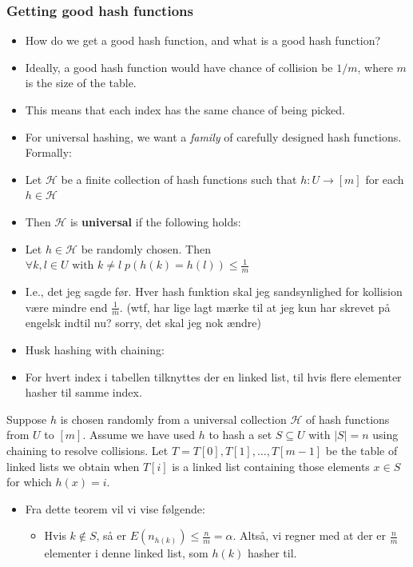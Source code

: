 \documentclass{beamer}
\begin{document}
\begin{frame}[allowframebreaks]
  \frametitle{Getting good hash functions}
  \begin{itemize}
  \item How do we get a good hash function, and what is a good hash function? 
  \item Ideally, a good hash function would have chance of collision be $1/m$, where $m$ is the size of the table. 
  \item This means that each index has the same chance of being picked. 
  \item For universal hashing, we want a \textit{family} of carefully designed hash functions. Formally:
  \item Let $\mathcal{H}$ be a finite collection of hash functions such that $h : U \rightarrow [m]$ for each $h \in \mathcal{H}$
  \item Then $\mathcal{H}$ is \textbf{universal} if the following holds: 
  \item Let $h \in \mathcal{H}$ be randomly chosen. Then $\forall k, l \in U \text{ with } k \neq l\;p(h(k)=h(l)) \leq \frac{1}{m}$
  \item I.e., det jeg sagde før. Hver hash funktion skal jeg sandsynlighed for kollision være mindre end $\frac{1}{m}$. (wtf, har lige lagt mærke til at jeg kun har skrevet på engelsk indtil nu? sorry, det skal jeg nok ændre)
  \item Husk hashing with chaining: 
  \item For hvert index i tabellen tilknyttes der en linked list, til hvis flere elementer hasher til samme index. 
\end{itemize}
\begin{theorem}[11.3 Cormen]
  Suppose $h$ is chosen randomly from a universal collection $\mathcal{H}$ of hash functions from $U$ to $[m]$.
  Assume we have used $h$ to hash a set $S \subseteq U$ with $|S| = n$ using chaining to resolve collisions.
  Let $T = T[0], T[1], \ldots, T[m-1]$ be the table of linked lists we obtain when $T[i]$ is a linked list containing those elements $x \in S$ for which $h(x) = i$.
\end{theorem}
\begin{itemize}
\item Fra dette teorem vil vi vise følgende: 
\begin{itemize}
\item Hvis $k \notin S$, så er $E(n_{h(k)}) \leq \frac{n}{m} = \alpha$. Altså, vi regner med at der er $\frac{n}{m}$ elementer i denne linked list, som $h(k)$ hasher til.

\end{itemize}
\end{itemize}
\end{frame}
\end{document}
